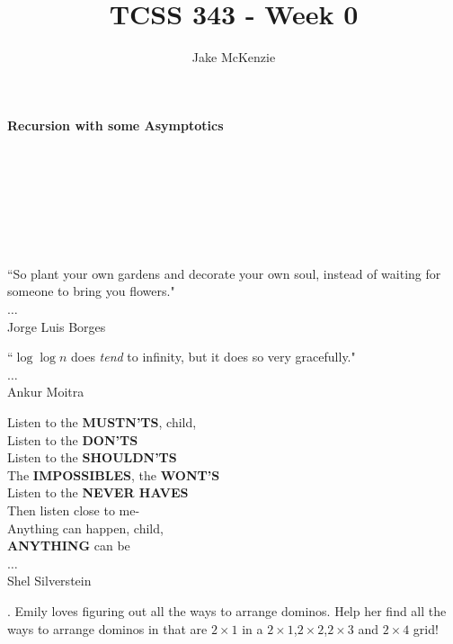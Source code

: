 \documentclass[12pt]{article}
\begin{document}
\title{TCSS 343 - Week 0}
\author{Jake McKenzie}
\maketitle
\noindent\centerline{\textbf{Recursion with some Asymptotics}}\\\\\\\\\\\\
\begin{center}
    ``So plant your own gardens and decorate your own soul, instead of waiting for someone to bring you flowers." \\$\dots$\\ Jorge Luis Borges
\end{center}
\begin{center}
    ``$\log{\log{n}}$ does \textit{tend} to infinity, but it does so very gracefully." \\$\dots$\\ Ankur Moitra
\end{center}
\begin{center}
Listen to the \textbf{MUSTN'TS}, child,\\
      Listen to the \textbf{DON'TS}\\
      Listen to the \textbf{SHOULDN'TS}\\
The \textbf{IMPOSSIBLES}, the \textbf{WONT'S}\\
      Listen to the \textbf{NEVER HAVES}\\
Then listen close to me-\\
      Anything can happen, child,\\
      \textbf{ANYTHING} can be\\ 
      $\dots$\\
      Shel Silverstein 
\end{center}
    \newpage
{}. Emily loves figuring out all the ways to arrange dominos. Help her find all the ways to arrange dominos in that are $2 \times 1$ in a $2 \times 1$,$2 \times 2$,$2 \times 3$ and $2 \times 4$ grid!\\\\\\\\\\\\\\\\\\\\\\\\
\end{document}
